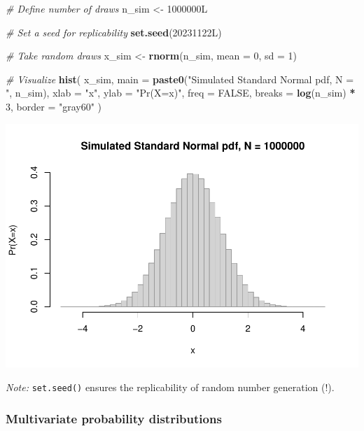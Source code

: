 \documentclass[
  11pt,
]{article}
\newenvironment{Shaded}{\begin{snugshade}}{\end{snugshade}}
\newcommand{\AttributeTok}[1]{\textcolor[rgb]{0.13,0.29,0.53}{#1}}
\newcommand{\CommentTok}[1]{\textcolor[rgb]{0.56,0.35,0.01}{\textit{#1}}}
\newcommand{\ConstantTok}[1]{\textcolor[rgb]{0.56,0.35,0.01}{#1}}
\newcommand{\DecValTok}[1]{\textcolor[rgb]{0.00,0.00,0.81}{#1}}
\newcommand{\FunctionTok}[1]{\textcolor[rgb]{0.13,0.29,0.53}{\textbf{#1}}}
\newcommand{\NormalTok}[1]{#1}
\newcommand{\OtherTok}[1]{\textcolor[rgb]{0.56,0.35,0.01}{#1}}
\newcommand{\SpecialCharTok}[1]{\textcolor[rgb]{0.81,0.36,0.00}{\textbf{#1}}}
\newcommand{\StringTok}[1]{\textcolor[rgb]{0.31,0.60,0.02}{#1}}
\begin{document}
\begin{Shaded}
\begin{Highlighting}[]
\CommentTok{\# Define number of draws}
\NormalTok{n\_sim }\OtherTok{\textless{}{-}}\NormalTok{ 1000000L}

\CommentTok{\# Set a seed for replicability}
\FunctionTok{set.seed}\NormalTok{(20231122L)}

\CommentTok{\# Take random draws}
\NormalTok{x\_sim }\OtherTok{\textless{}{-}} \FunctionTok{rnorm}\NormalTok{(n\_sim, }\AttributeTok{mean =} \DecValTok{0}\NormalTok{, }\AttributeTok{sd =} \DecValTok{1}\NormalTok{)}

\CommentTok{\# Visualize}
\FunctionTok{hist}\NormalTok{(}
\NormalTok{  x\_sim,}
  \AttributeTok{main =} \FunctionTok{paste0}\NormalTok{(}\StringTok{"Simulated Standard Normal pdf, N = "}\NormalTok{, n\_sim),}
  \AttributeTok{xlab =} \StringTok{"x"}\NormalTok{,}
  \AttributeTok{ylab =} \StringTok{"Pr(X=x)"}\NormalTok{,}
  \AttributeTok{freq =} \ConstantTok{FALSE}\NormalTok{,}
  \AttributeTok{breaks =} \FunctionTok{log}\NormalTok{(n\_sim) }\SpecialCharTok{*} \DecValTok{3}\NormalTok{,}
  \AttributeTok{border =} \StringTok{"gray60"}
\NormalTok{)}
\end{Highlighting}
\end{Shaded}

\begin{center}\includegraphics{01-01-lec_files/figure-latex/stdnorm-8-1} \end{center}

\emph{Note:} \texttt{set.seed()} ensures the replicability of random number generation (!).

\hypertarget{multivariate-probability-distributions}{%
\subsubsection{Multivariate probability distributions}\label{multivariate-probability-distributions}}
\end{document}
